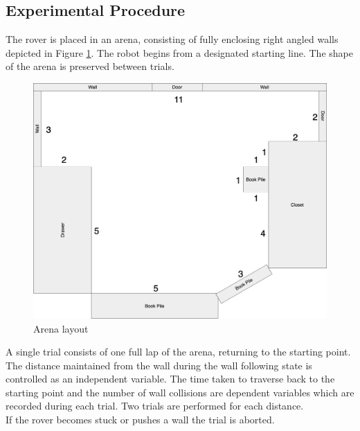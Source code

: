 \documentclass[a4paper,12pt,twocolumn]{article}
\begin{document}
\subsection{Experimental Procedure}

The rover is placed in an arena, consisting of fully enclosing right angled walls depicted in Figure \ref{fig:arena-layout}. The robot begins from a designated starting line. The shape of the arena is preserved between trials.\\

\begin{figure}[ht]
\centering
\includegraphics[width=\linewidth]{figures/arena-layout/Arena Layout.png}
\caption{Arena layout}
  \label{fig:arena-layout}
\end{figure}

A single trial consists of one full lap of the arena, returning to the starting point. The distance maintained from the wall during the wall following state is controlled as an independent variable. The time taken to traverse back to the starting point and the number of wall collisions are dependent variables which are recorded during each trial. Two trials are performed for each distance.\\

If the rover becomes stuck or pushes a wall the trial is aborted.  
\end{document}

